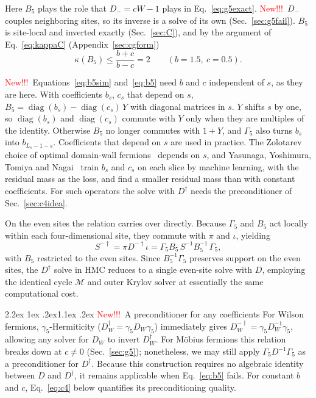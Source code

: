 \documentclass[11pt,a4paper]{article}
\makeatletter
\newcounter{alg}
\newif\ifshownew \shownewtrue
\DeclareRobustCommand\New{\ifshownew\textcolor{red}{New!!!}\ \else\ignorespaces\fi}
\renewcommand\subsection{\@startsection{subsection}{2}{\z@}%
  {2.2ex \@plus 1ex \@minus .2ex}{1.1ex \@plus .2ex}%
  {\centering\normalfont\small\bfseries}}
\numberwithin{equation}{section}
\newcommand{\dg}{^{\dagger}}
\newcommand{\Gfive}{\Gamma_5}
\makeatother
\begin{document}
Here $B_5$ plays the role that $D_-=cW-1$ plays in Eq.~\eqref{eq:g5exact}.
\New $D_-$ couples neighboring sites, so its inverse is a solve of its own (Sec.~\ref{sec:g5fail}).
$B_5$ is site-local and inverted exactly (Sec.~\ref{sec:C}), and by the argument of
Eq.~\eqref{eq:kappaC} (Appendix~\ref{sec:cgform})
\begin{equation}
\kappa(B_5)\le\frac{b+c}{b-c}=2\qquad(b=1.5,\ c=0.5).
\end{equation}

\New Equations~\eqref{eq:b5sim} and~\eqref{eq:b5} need $b$ and $c$ independent of $s$, as they are
here. With coefficients $b_s$, $c_s$ that depend on $s$,
$B_5=\operatorname{diag}(b_s)-\operatorname{diag}(c_s)\,Y$ with diagonal matrices in $s$. $Y$
shifts $s$ by one, so $\operatorname{diag}(b_s)$ and $\operatorname{diag}(c_s)$ commute with $Y$
only when they are multiples of the identity. Otherwise $B_5$ no longer commutes
with $1+Y$, and $\Gfive$ also turns $b_s$ into $b_{L_s-1-s}$. Coefficients that depend on $s$
are used in practice. The Zolotarev choice of optimal domain-wall fermions~\cite{ChiuZolo} depends on $s$,
and Yasunaga, Yoshimura, Tomiya and Nagai~\cite{YasunagaML} train $b_s$ and $c_s$ on each slice by
machine learning, with the residual mass as the loss, and find a smaller residual mass than with
constant coefficients. For such operators the solve with $D\dg$
needs the preconditioner of Sec.~\ref{sec:c4idea}.

On the even sites the relation carries over directly. Because $\Gfive$ and $B_5$ act locally within
each four-dimensional site, they commute with $\pi$ and $\iota$, yielding
\begin{equation}
S^{-\dagger}=\pi D^{-\dagger}\iota=\Gfive B_5\,S^{-1}B_5^{-1}\,\Gfive ,
\end{equation}
with $B_5$ restricted to the even sites. Since $B_5^{-1}\Gfive$ preserves support on the even
sites, the $D\dg$ solve in HMC reduces to a single even-site solve with $D$, employing the
identical cycle $\mathcal M$ and outer Krylov solver at essentially the same computational cost.

\subsection{\New A preconditioner for any coefficients}
\label{sec:c4idea}
For Wilson fermions, $\gamma_5$-Hermiticity ($D_W\dg=\gamma_5D_W\gamma_5$) immediately gives
$D_W^{-\dagger}=\gamma_5D_W^{-1}\gamma_5$, allowing any solver for $D_W$ to invert $D_W\dg$. For
M\"obius fermions this relation breaks down at $c\neq0$ (Sec.~\ref{sec:g5}); nonetheless, we may
still apply $\Gfive D^{-1}\Gfive$ as a preconditioner for $D\dg$. Because this construction
requires no algebraic identity between $D$ and $D\dg$, it remains applicable when
Eq.~\eqref{eq:b5} fails. For constant $b$ and $c$, Eq.~\eqref{eq:c4} below quantifies its
preconditioning quality.
\end{document}
